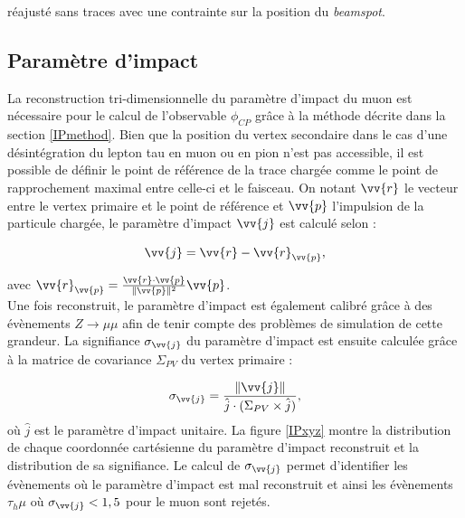 réajusté sans traces avec une contrainte sur la position du \textit{beamspot}.

\subsection{Paramètre d'impact}
\label{IPreco}

La reconstruction tri-dimensionnelle du paramètre d'impact du muon est nécessaire pour le calcul de l'observable $\phi_{CP}$ grâce à la méthode décrite dans la section \ref{IPmethod}. Bien que la position du vertex secondaire dans le cas d'une désintégration du lepton tau en muon ou en pion n'est pas accessible, il est possible de définir le point de référence de la trace chargée comme le point de rapprochement maximal entre celle-ci et le faisceau. On notant $\vv{r}$ le vecteur entre le vertex primaire et le point de référence et $\vv{p}$ l'impulsion de la particule chargée, le paramètre d'impact $\vv{j}$ est calculé selon :

\begin{equation}
    \vv{j}=\vv{r}-\vv{r}_{\vv{p}},    
\end{equation}

avec $\vv{r}_{\vv{p}}=\frac{\vv{r}\cdot\vv{p}}{\lVert\vv{p}\rVert^2}\vv{p}$. \\

Une fois reconstruit, le paramètre d'impact est également calibré grâce à des évènements $Z\to\mu\mu$ afin de tenir compte des problèmes de simulation de cette grandeur. La signifiance $\sigma_{\vv{j}}$ du paramètre d'impact est ensuite calculée grâce à la matrice de covariance $\Sigma_{PV}$ du vertex primaire :

\begin{equation}
    \sigma_{\vv{j}}=\frac{\lVert\vv{j}\rVert}{\hat{j}\cdot(\Sigma_{PV}\times\hat{j})},
\end{equation}
où $\hat{j}$ est le paramètre d'impact unitaire. La figure \ref{IPxyz} montre la distribution de chaque coordonnée cartésienne du paramètre d'impact reconstruit et la distribution de sa signifiance. Le calcul de $\sigma_{\vv{j}}$ permet d'identifier les évènements où le paramètre d'impact est mal reconstruit et ainsi les évènements $\tau_h\mu$ où $\sigma_{\vv{j}}<1,5$ pour le muon sont rejetés.


